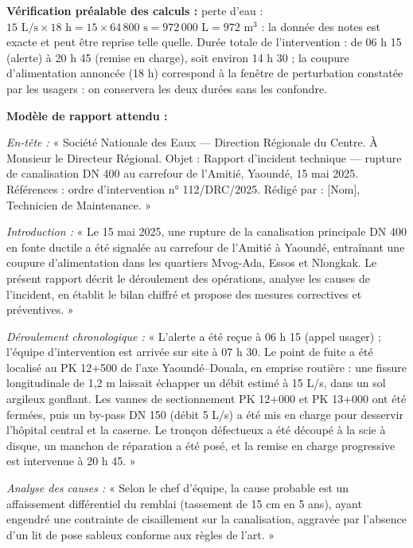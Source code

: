 \documentclass[11pt]{article}
\begin{document}
\begin{corrige}
\textbf{Vérification préalable des calculs :} perte d'eau : $15 \text{ L/s} \times 18 \text{ h} = 15 \times 64\,800 \text{ s} = 972\,000 \text{ L} = 972 \text{ m}^3$ : la donnée des notes est exacte et peut être reprise telle quelle. Durée totale de l'intervention : de 06 h 15 (alerte) à 20 h 45 (remise en charge), soit environ 14 h 30 ; la coupure d'alimentation annoncée (18 h) correspond à la fenêtre de perturbation constatée par les usagers : on conservera les deux durées sans les confondre.

\textbf{Modèle de rapport attendu :}

\emph{En-tête :} « Société Nationale des Eaux — Direction Régionale du Centre. À Monsieur le Directeur Régional. Objet : Rapport d'incident technique — rupture de canalisation DN 400 au carrefour de l'Amitié, Yaoundé, 15 mai 2025. Références : ordre d'intervention n° 112/DRC/2025. Rédigé par : [Nom], Technicien de Maintenance. »

\emph{Introduction :} « Le 15 mai 2025, une rupture de la canalisation principale DN 400 en fonte ductile a été signalée au carrefour de l'Amitié à Yaoundé, entraînant une coupure d'alimentation dans les quartiers Mvog-Ada, Essos et Nlongkak. Le présent rapport décrit le déroulement des opérations, analyse les causes de l'incident, en établit le bilan chiffré et propose des mesures correctives et préventives. »

\emph{Déroulement chronologique :} « L'alerte a été reçue à 06 h 15 (appel usager) ; l'équipe d'intervention est arrivée sur site à 07 h 30. Le point de fuite a été localisé au PK 12+500 de l'axe Yaoundé--Douala, en emprise routière : une fissure longitudinale de 1,2 m laissait échapper un débit estimé à 15 L/s, dans un sol argileux gonflant. Les vannes de sectionnement PK 12+000 et PK 13+000 ont été fermées, puis un by-pass DN 150 (débit 5 L/s) a été mis en charge pour desservir l'hôpital central et la caserne. Le tronçon défectueux a été découpé à la scie à disque, un manchon de réparation a été posé, et la remise en charge progressive est intervenue à 20 h 45. »

\emph{Analyse des causes :} « Selon le chef d'équipe, la cause probable est un affaissement différentiel du remblai (tassement de 15 cm en 5 ans), ayant engendré une contrainte de cisaillement sur la canalisation, aggravée par l'absence d'un lit de pose sableux conforme aux règles de l'art. »


\end{corrige}
\end{document}
